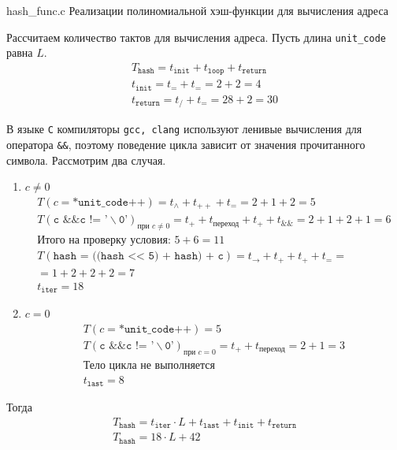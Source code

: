 \documentclass{bmstu}
\begin{document}
        {hash_func.c}
        {Реализации полиномиальной хэш-функции для вычисления адреса}

    Рассчитаем количество тактов для вычисления адреса.
    Пусть длина \texttt{unit\_code} равна $L$.
    \begin{gather*}
        T_{\texttt{hash}} = t_{\texttt{init}} + t_{\texttt{loop}} + t_{\texttt{return}} \\
        t_{\texttt{init}} = t_{=} + t_{=} = 2 + 2 = 4 \\ 
        t_{\texttt{return}} = t_{/} + t_{=} = 28 + 2 = 30
    \end{gather*}
    
    В языке \texttt{C} компиляторы \texttt{gcc, clang} используют ленивые вычисления для оператора \texttt{\&\&},
    поэтому поведение цикла зависит от значения прочитанного символа. Рассмотрим два случая.
    \begin{enumerate}
        \item $ c \neq 0$
            \begin{gather*}
                T(c = \texttt{*unit\_code++}) = t_{\wedge} + t_{++} + t_{=} = 2 + 1 + 2 = 5 \\
                T(\texttt{c \&\& c != '$\backslash$0'})_{\text{при } c \neq 0} = t_{+} + t_{\text{переход}} + t_{+} + t_{\&\&} = 2 + 1 + 2 + 1 = 6 \\
                \text{Итого на проверку условия: } 5 + 6 = 11 \\
                T(\texttt{hash = ((hash << 5) + hash) + c}) = t_{\rightarrow} + t_{+} + t_{+} + t_{=} = \\ = 1 + 2 + 2 + 2 = 7 \\
                t_{\texttt{iter}} = 18
            \end{gather*}
        \item $ c = 0$
         \begin{gather*}
            T(c = \texttt{*unit\_code++}) = 5 \\
            T(\texttt{c \&\& c != '$\backslash$0'})_{\text{при } c = 0} = t_{+} + t_{\text{переход}} = 2 + 1 = 3 \\
            \text{Тело цикла не выполняется} \\
            t_{\texttt{last}} = 8
         \end{gather*}
    \end{enumerate}

    Тогда 
    \begin{gather*}
        T_{\texttt{hash}} = t_{\texttt{iter}}\cdot L + t_{\texttt{last}} + t_{\texttt{init}} + t_{\texttt{return}} \\
        T_{\texttt{hash}} = 18\cdot L + 42
    \end{gather*} 
\end{document}
